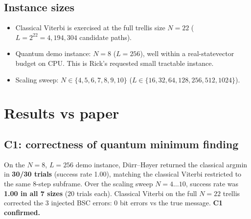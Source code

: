 \documentclass[11pt]{article}
\begin{document}
\subsection{Instance sizes}
\begin{itemize}
\item Classical Viterbi is exercised at the full trellis size $N{=}22$
      ($L=2^{22}=4{,}194{,}304$ candidate paths).
\item Quantum demo instance: $N{=}8$ ($L{=}256$), well within a
      real-statevector budget on CPU. This is Rick's requested small
      tractable instance.
\item Scaling sweep: $N{\in}\{4,5,6,7,8,9,10\}$
      ($L\in\{16,32,64,128,256,512,1024\}$).
\end{itemize}

\section{Results vs paper}

\subsection{C1: correctness of quantum minimum finding}
On the $N{=}8$, $L{=}256$ demo instance, D\"urr--H{\o}yer returned the
classical argmin in \textbf{30/30 trials} (success rate 1.00), matching
the classical Viterbi restricted to the same 8-step subframe. Over the
scaling sweep $N{=}4\ldots10$, success rate was \textbf{1.00 in all 7
sizes} ($20$ trials each). Classical Viterbi on the full $N{=}22$
trellis corrected the 3 injected BSC errors: 0 bit errors vs the true
message. \textbf{C1 confirmed.}
\end{document}
